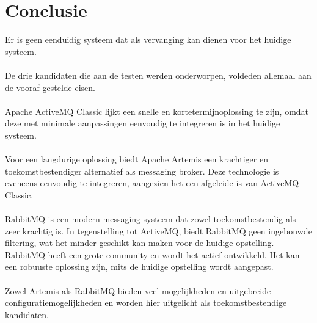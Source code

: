 
\chapter{Conclusie}%
\label{ch:conclusie}


Er is geen eenduidig systeem dat als vervanging kan dienen voor het huidige systeem.
\\\\
De drie kandidaten die aan de testen werden onderworpen, voldeden allemaal aan de vooraf gestelde eisen.
\\\\
Apache ActiveMQ Classic lijkt een snelle en kortetermijnoplossing te zijn, 
omdat deze met minimale aanpassingen eenvoudig te integreren is in het huidige systeem.
\\\\
Voor een langdurige oplossing biedt Apache Artemis een krachtiger en toekomstbestendiger alternatief als messaging broker. 
Deze technologie is eveneens eenvoudig te integreren, aangezien het een afgeleide is van ActiveMQ Classic.
\\\\
RabbitMQ is een modern messaging-systeem dat zowel toekomstbestendig als zeer krachtig is. 
In tegenstelling tot ActiveMQ, biedt RabbitMQ geen ingebouwde filtering, wat het minder geschikt kan maken voor de huidige opstelling.
RabbitMQ heeft een grote community en wordt het actief ontwikkeld. Het kan een robuuste oplossing zijn, 
mits de huidige opstelling wordt aangepast.
\\\\
Zowel Artemis als RabbitMQ bieden veel mogelijkheden en uitgebreide configuratiemogelijkheden en worden hier uitgelicht als toekomstbestendige kandidaten.


